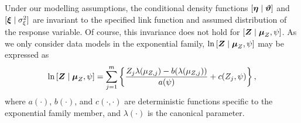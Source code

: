 \documentclass[article]{jss}
\def\mbf#1{{%
\mathchoice%
{\hbox{\boldmath$\displaystyle{#1}$}}%
{\hbox{\boldmath$\textstyle{#1}$}}%
{\hbox{\boldmath$\scriptstyle{#1}$}}%
{\hbox{\boldmath$\scriptscriptstyle{#1}$}}%
}}
\def\vec{\mbf}
\begin{document}
Under our modelling assumptions, the conditional density functions  $[\vec{\eta}\mid\vec{\vartheta}]$ and $[\vec{\xi} \mid \sigma^2_\xi]$ are invariant to the specified link function and assumed distribution of the response variable. 
 Of course, this invariance does not hold for $[\vec{Z} \mid \vec{\mu}_Z, \psi]$. 
As we only consider data models in the exponential family, $\ln{[\vec{Z}  \mid  \vec{\mu}_Z, \psi]}$ may be expressed as  
\begin{equation}\label{eqn:ln[Z|Y],ExpFam}
\ln{[\vec{Z} \mid \vec{\mu}_Z, \psi]}
=
\sum_{j=1}^m\left\{
\frac{Z_j\lambda(\mu_{Z, j}) - b(\lambda(\mu_{Z, j}))}{a(\psi)} + c(Z_j, \psi)\right\},
\end{equation}
where $a(\cdot)$, $b(\cdot)$, and $c(\cdot, \cdot)$ are deterministic functions specific to the exponential family member, and $\lambda(\cdot)$ is the canonical parameter. %

\end{document}
